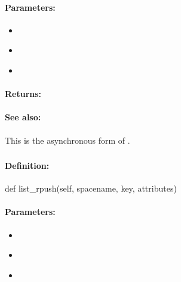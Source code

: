\paragraph{Parameters:}
\begin{itemize}[noitemsep]
\item {}\\

\item {}\\

\item {}\\

\end{itemize}

\paragraph{Returns:}


\paragraph{See also:}  This is the asynchronous form of .

\pagebreak
\subsubsection{}
\label{api:python:list_rpush}


\paragraph{Definition:}
\begin{pythoncode}
def list_rpush(self, spacename, key, attributes)
\end{pythoncode}

\paragraph{Parameters:}
\begin{itemize}[noitemsep]
\item {}\\

\item {}\\

\item {}\\

\end{itemize}

